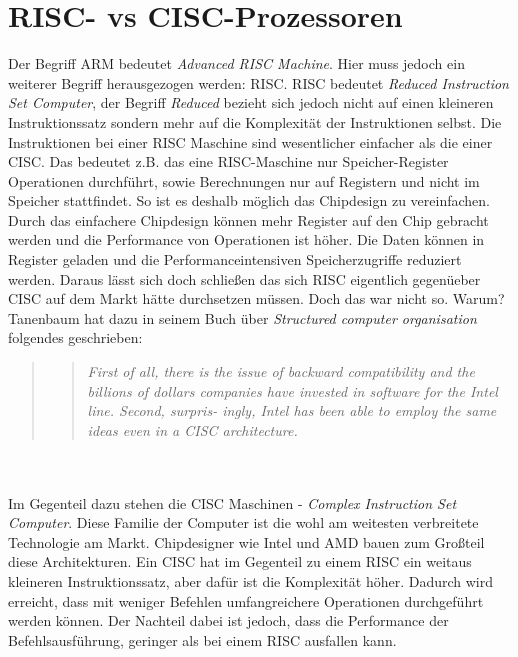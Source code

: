 \section{RISC- vs CISC-Prozessoren}
Der Begriff ARM bedeutet \textit{Advanced RISC Machine}. Hier muss jedoch ein weiterer Begriff herausgezogen werden: RISC. RISC bedeutet \textit{Reduced Instruction Set Computer}, der Begriff \textit{Reduced} bezieht sich jedoch nicht auf einen kleineren Instruktionssatz sondern mehr auf die Komplexit\"at der Instruktionen selbst. Die Instruktionen bei einer RISC Maschine sind wesentlicher einfacher als die einer CISC. Das bedeutet z.B. das eine RISC-Maschine nur Speicher-Register Operationen durchf\"uhrt, sowie Berechnungen nur auf Registern und nicht im Speicher stattfindet. So ist es deshalb m\"oglich das Chipdesign zu vereinfachen. Durch das einfachere Chipdesign k\"onnen mehr Register auf den Chip gebracht werden und die Performance von Operationen ist h\"oher. Die Daten k\"onnen in  Register geladen und die Performanceintensiven Speicherzugriffe reduziert werden. Daraus l\"asst sich doch schlie\ss en das sich RISC eigentlich gegen\"ueber CISC auf dem Markt h\"atte durchsetzen m\"ussen. Doch das war nicht so. Warum? Tanenbaum hat dazu in seinem Buch \"uber \textit{Structured computer organisation} folgendes geschrieben: 
\begin{quote}
\blockquote{\textit{First of all, there is the issue of backward compatibility and the billions of
dollars companies have invested in software for the Intel line. Second, surpris-
ingly, Intel has been able to employ the same ideas even in a CISC architecture.}}
\end{quote}\parencite[80]{tane:sco} \\\\
Im Gegenteil dazu stehen die CISC Maschinen - \textit{Complex Instruction Set Computer}. Diese Familie der Computer ist die wohl am weitesten verbreitete Technologie am Markt. Chipdesigner wie Intel und AMD bauen zum Gro\ss teil diese Architekturen. Ein CISC hat im Gegenteil zu einem RISC ein weitaus kleineren Instruktionssatz, aber daf\"ur ist die Komplexit\"at h\"oher. Dadurch wird erreicht, dass mit weniger Befehlen umfangreichere Operationen durchgef\"uhrt werden k\"onnen. Der Nachteil dabei ist jedoch, dass die Performance der Befehlsausf\"uhrung, geringer als bei einem RISC ausfallen kann.
